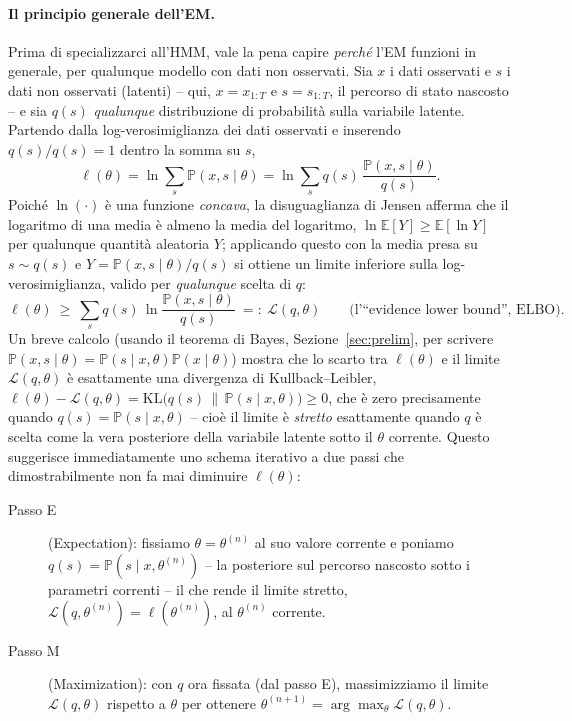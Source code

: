 \documentclass[11pt]{article}
\theoremstyle{definition}
\theoremstyle{remark}
\begin{document}
\paragraph{Il principio generale dell'EM.} Prima di specializzarci all'HMM, vale la pena capire \emph{perch\'e} l'EM funzioni in generale, per qualunque modello con dati non osservati. Sia $x$ i dati osservati e $s$ i dati non osservati (latenti) -- qui, $x=x_{1:T}$ e $s=s_{1:T}$, il percorso di stato nascosto -- e sia $q(s)$ \emph{qualunque} distribuzione di probabilit\`a sulla variabile latente. Partendo dalla log-verosimiglianza dei dati osservati e inserendo $q(s)/q(s)=1$ dentro la somma su $s$,
\[
\ell(\theta) = \ln\sum_s \mathbb{P}(x,s\mid\theta) = \ln\sum_s q(s)\,\frac{\mathbb{P}(x,s\mid\theta)}{q(s)}.
\]
Poich\'e $\ln(\cdot)$ \`e una funzione \emph{concava}, la disuguaglianza di Jensen afferma che il logaritmo di una media \`e almeno la media del logaritmo, $\ln\mathbb{E}[Y]\ge\mathbb{E}[\ln Y]$ per qualunque quantit\`a aleatoria $Y$; applicando questo con la media presa su $s\sim q(s)$ e $Y=\mathbb{P}(x,s\mid\theta)/q(s)$ si ottiene un limite inferiore sulla log-verosimiglianza, valido per \emph{qualunque} scelta di $q$:
\[
\ell(\theta) \ \ge\ \sum_s q(s)\,\ln\frac{\mathbb{P}(x,s\mid\theta)}{q(s)} \ =:\ \mathcal{L}(q,\theta) \qquad\text{(l'``evidence lower bound'', ELBO).}
\]
Un breve calcolo (usando il teorema di Bayes, Sezione~\ref{sec:prelim}, per scrivere $\mathbb{P}(x,s\mid\theta)=\mathbb{P}(s\mid x,\theta)\mathbb{P}(x\mid\theta)$) mostra che lo scarto tra $\ell(\theta)$ e il limite $\mathcal{L}(q,\theta)$ \`e esattamente una divergenza di Kullback--Leibler, $\ell(\theta)-\mathcal L(q,\theta)=\mathrm{KL}\big(q(s)\,\|\,\mathbb{P}(s\mid x,\theta)\big)\ge0$, che \`e zero precisamente quando $q(s)=\mathbb{P}(s\mid x,\theta)$ -- cio\`e il limite \`e \emph{stretto} esattamente quando $q$ \`e scelta come la vera posteriore della variabile latente sotto il $\theta$ corrente. Questo suggerisce immediatamente uno schema iterativo a due passi che dimostrabilmente non fa mai diminuire $\ell(\theta)$:
\begin{description}
    \item[Passo E] (Expectation): fissiamo $\theta=\theta^{(n)}$ al suo valore corrente e poniamo $q(s)=\mathbb{P}(s\mid x,\theta^{(n)})$ -- la posteriore sul percorso nascosto sotto i parametri correnti -- il che rende il limite stretto, $\mathcal L(q,\theta^{(n)})=\ell(\theta^{(n)})$, al $\theta^{(n)}$ corrente.
    \item[Passo M] (Maximization): con $q$ ora fissata (dal passo E), massimizziamo il limite $\mathcal L(q,\theta)$ rispetto a $\theta$ per ottenere $\theta^{(n+1)}=\arg\max_\theta\mathcal L(q,\theta)$.
\end{description}
\end{document}
